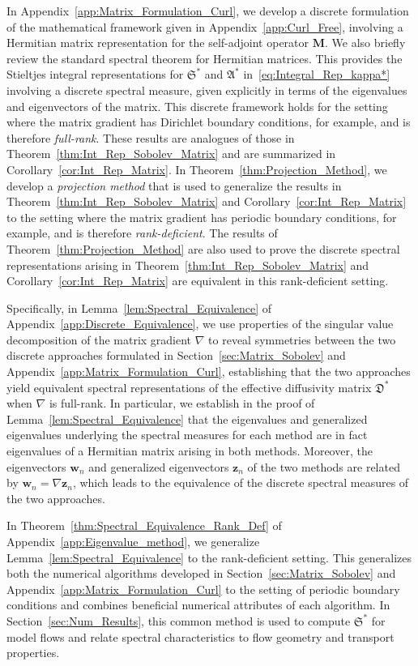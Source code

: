 \documentclass[english,12pt,jmp,graphicx]{revtex4-1}
\newcommand{\vecw}{\boldsymbol{w}}
\newcommand{\vecz}{\boldsymbol{z}}
\newcommand{\thmref}[1]{Theorem~\ref{#1}}
\newcommand{\corref}[1]{Corollary~\ref{#1}}
\newcommand{\lemref}[1]{Lemma~\ref{#1}}
\newcommand{\secref}[1]{Section~\ref{#1}}
\newcommand{\appref}[1]{Appendix~\ref{#1}}
\newcommand{\Sg}{\mathfrak{S}}
\newcommand{\Ag}{\mathfrak{A}}
\newcommand{\Dg}{\mathfrak{D}}
\newcommand{\Mb}{\mathbf{M}}
\begin{document}
In \appref{app:Matrix_Formulation_Curl}, we develop a discrete
formulation of the mathematical framework given in \appref{app:Curl_Free},
involving a Hermitian matrix representation for the self-adjoint
operator $\Mb$. We also briefly review the standard spectral theorem for
Hermitian matrices. This provides the Stieltjes integral
representations for $\Sg^*$ and $\Ag^*$
in~\eqref{eq:Integral_Rep_kappa*} involving a discrete spectral
measure, given explicitly in terms of the eigenvalues and
eigenvectors of the matrix. This discrete framework holds for the
setting where the matrix gradient has Dirichlet boundary conditions,
for example, and is therefore \emph{full-rank}. These results are
analogues of those in \thmref{thm:Int_Rep_Sobolev_Matrix} and are
summarized in \corref{cor:Int_Rep_Matrix}. In
\thmref{thm:Projection_Method}, we develop a \emph{projection
method} that is used to generalize the results in
\thmref{thm:Int_Rep_Sobolev_Matrix} and \corref{cor:Int_Rep_Matrix} to
the setting where the matrix gradient has periodic boundary
conditions, for example,
and is therefore \emph{rank-deficient}. The results of
\thmref{thm:Projection_Method} are also used to prove the discrete
spectral representations arising in
\thmref{thm:Int_Rep_Sobolev_Matrix} and \corref{cor:Int_Rep_Matrix}
are equivalent in this rank-deficient setting.




Specifically, in \lemref{lem:Spectral_Equivalence} of
\appref{app:Discrete_Equivalence}, we use properties of the singular
value decomposition of the matrix gradient $\nabla$ to reveal
symmetries between the two discrete approaches formulated in
Section~\ref{sec:Matrix_Sobolev} and \appref{app:Matrix_Formulation_Curl},
establishing  that the two approaches yield equivalent spectral
representations of the effective diffusivity  matrix $\Dg^*$ when
$\nabla$ is full-rank. In particular, we establish in the 
proof of \lemref{lem:Spectral_Equivalence} that the eigenvalues and
generalized eigenvalues underlying the spectral measures for each
method are in fact eigenvalues of a Hermitian matrix arising in both 
methods. Moreover, the eigenvectors $\vecw_n$ and generalized
eigenvectors $\vecz_n$ of the two methods are related by
$\vecw_n=\nabla\vecz_n$, which leads to the equivalence of the
discrete spectral measures of the two approaches.



In \thmref{thm:Spectral_Equivalence_Rank_Def} of
\appref{app:Eigenvalue_method}, we generalize
\lemref{lem:Spectral_Equivalence} to the rank-deficient setting. This
generalizes both the numerical algorithms developed in 
\secref{sec:Matrix_Sobolev} 
and \appref{app:Matrix_Formulation_Curl} to the setting of periodic boundary  
conditions and combines beneficial numerical attributes of each
algorithm. In \secref{sec:Num_Results}, this common method is used to
compute $\Sg^*$ for model flows and relate spectral
characteristics to flow geometry and transport 
properties.
\end{document}
